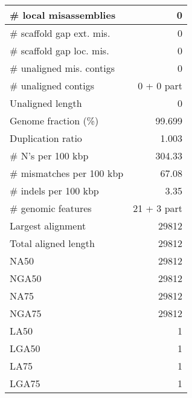 \documentclass[12pt,a4paper]{article}
\begin{document}
\begin{table}[ht]
\begin{center}
\begin{tabular}{|l*{1}{|r}|}
\# local misassemblies & 0 \\ \hline
\# scaffold gap ext. mis. & 0 \\ \hline
\# scaffold gap loc. mis. & 0 \\ \hline
\# unaligned mis. contigs & 0 \\ \hline
\# unaligned contigs & 0 + 0 part \\ \hline
Unaligned length & 0 \\ \hline
Genome fraction (\%) & 99.699 \\ \hline
Duplication ratio & 1.003 \\ \hline
\# N's per 100 kbp & 304.33 \\ \hline
\# mismatches per 100 kbp & 67.08 \\ \hline
\# indels per 100 kbp & 3.35 \\ \hline
\# genomic features & 21 + 3 part \\ \hline
Largest alignment & 29812 \\ \hline
Total aligned length & 29812 \\ \hline
NA50 & 29812 \\ \hline
NGA50 & 29812 \\ \hline
NA75 & 29812 \\ \hline
NGA75 & 29812 \\ \hline
LA50 & 1 \\ \hline
LGA50 & 1 \\ \hline
LA75 & 1 \\ \hline
LGA75 & 1 \\ \hline
\end{tabular}
\end{center}
\end{table}
\end{document}
